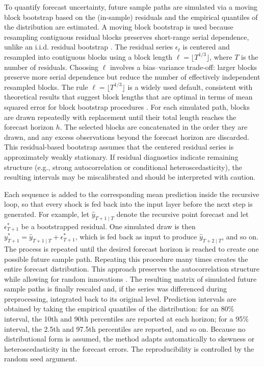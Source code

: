 To quantify forecast uncertainty, future sample paths are simulated via a moving block bootstrap based on the (in-sample) residuals and the empirical quantiles of the distribution are estimated. A moving block bootstrap is used because resampling contiguous residual blocks preserves short-range serial dependence, unlike an i.i.d. residual bootstrap \citep{Kunsch1989}. The residual series \(\epsilon_t\) is centered and resampled into contiguous blocks using a block length \(\ell = \lfloor T^{1/3} \rfloor\), where \(T\) is the number of residuals. Choosing \(\ell\) involves a bias--variance trade-off: larger blocks preserve more serial dependence but reduce the number of effectively independent resampled blocks. The rule \(\ell = \lfloor T^{1/3} \rfloor\) is a widely used default, consistent with theoretical results that suggest block lengths that are optimal in terms of mean squared error for block bootstrap procedures \citep{Politis1994, Politis2004}. For each simulated path, blocks are drawn repeatedly with replacement until their total length reaches the forecast horizon \(h\). The selected blocks are concatenated in the order they are drawn, and any excess observations beyond the forecast horizon are discarded. This residual-based bootstrap assumes that the centered residual series is approximately weakly stationary. If residual diagnostics indicate remaining structure (e.g., strong autocorrelation or conditional heteroscedasticity), the resulting intervals may be miscalibrated and should be interpreted with caution.

Each sequence is added to the corresponding mean prediction inside the recursive loop, so that every shock is fed back into the input layer before the next step is generated. For example, let \(\hat{y}_{T+1 \mid T}\) denote the recursive point forecast and let \(\epsilon^{*}_{T+1}\) be a bootstrapped residual. One simulated draw is then \(y^{*}_{T+1} = \hat{y}_{T+1 \mid T} + \epsilon^{*}_{T+1}\), which is fed back as input to produce \(\hat{y}_{T+2 \mid T}\), and so on. The process is repeated until the desired forecast horizon is reached to create one possible future sample path. Repeating this procedure many times creates the entire forecast distribution. This approach preserves the autocorrelation structure while allowing for random innovations \citep{Hyndman2021}. The resulting matrix of simulated future sample paths is finally rescaled and, if the series was differenced during preprocessing, integrated back to its original level. Prediction intervals are obtained by taking the empirical quantiles of the distribution: for an 80\% interval, the 10th and 90th percentiles are reported at each horizon; for a 95\% interval, the 2.5th and 97.5th percentiles are reported, and so on. Because no distributional form is assumed, the method adapts automatically to skewness or heteroscedasticity in the forecast errors. The reproducibility is controlled by the random seed argument.

